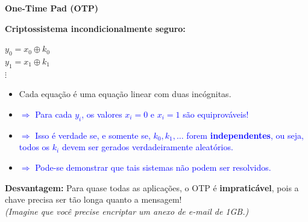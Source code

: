 \documentclass{beamer}
\begin{document}
\begin{frame}{\textbf{One-Time Pad (OTP)}}

\textbf{Criptossistema incondicionalmente seguro:}
\begin{center}
        $y_0 = x_0 \oplus k_0$ \\
        $y_1 = x_1 \oplus k_1$ \\
        $\vdots$
\end{center}
\vspace{-1em}

\begin{itemize}
    \item Cada equação é uma equação linear com duas incógnitas.
    \item \textcolor{blue}{$\Rightarrow$ Para cada $y_i$, os valores $x_i = 0$ e $x_i = 1$ são equiprováveis!}
    \item \textcolor{blue}{$\Rightarrow$ Isso é verdade se, e somente se, $k_0, k_1, \ldots$ forem \textbf{independentes}, ou seja, todos os $k_i$ devem ser gerados verdadeiramente aleatórios.}
    \item \textcolor{blue}{$\Rightarrow$ Pode-se demonstrar que tais sistemas não podem ser resolvidos.}
\end{itemize}

\vspace{1em}
\textbf{Desvantagem:} Para quase todas as aplicações, o OTP é \textbf{impraticável}, pois a chave precisa ser tão longa quanto a mensagem! \\
\small{\textit{(Imagine que você precise encriptar um anexo de e-mail de 1GB.)}}

\end{frame}

\end{document}
